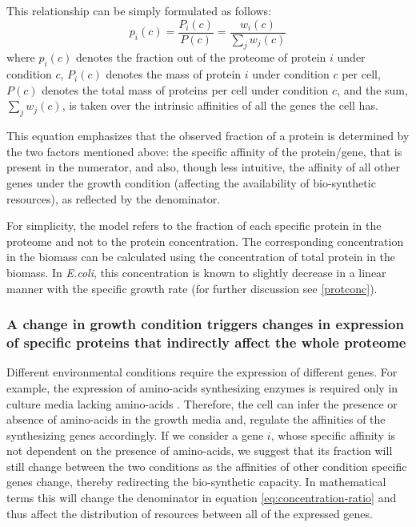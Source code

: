 \documentclass{article}
\begin{document}
This relationship can be simply formulated as follows:
\begin{equation}
  \label{eq:concentration-ratio}
  p_i(c)=\frac{P_i(c)}{P(c)}=\frac{w_i(c)}{\sum_jw_j(c)}
\end{equation}
where $p_i(c)$ denotes the fraction out of the proteome of protein $i$ under condition $c$, $P_i(c)$ denotes the mass of protein $i$ under condition $c$ per cell, $P(c)$ denotes the total mass of proteins per cell under condition $c$, and the sum, $\sum_jw_j(c)$, is taken over the intrinsic affinities of all the genes the cell has.

This equation emphasizes that the observed fraction of a protein is determined by the two factors mentioned above: the specific affinity of the protein/gene, that is present in the numerator, and also, though less intuitive, the affinity of all other genes under the growth condition (affecting the availability of bio-synthetic resources), as reflected by the denominator.

For simplicity, the model refers to the fraction of each specific protein in the proteome and not to the protein concentration.
The corresponding concentration in the biomass can be calculated using the concentration of total protein in the biomass.
In \emph{E.coli}, this concentration is known to slightly decrease in a linear manner with the specific growth rate \cite{Bremer1987,Valgepea2013,Scott2014} (for further discussion see \ref{protconc}).


\subsubsection{A change in growth condition triggers changes in expression of specific proteins that indirectly affect the whole proteome}
Different environmental conditions require the expression of different genes.
For example, the expression of amino-acids synthesizing enzymes is required only in culture media lacking amino-acids \cite{24656150,10515934}.
Therefore, the cell can infer the presence or absence of amino-acids in the growth media and, regulate the affinities of the synthesizing genes accordingly.
If we consider a gene $i$, whose specific affinity is not dependent on the presence of amino-acids, we suggest that its fraction will still change between the two conditions as the affinities of other condition specific genes change, thereby redirecting the bio-synthetic capacity.
In mathematical terms this will change the denominator in equation \ref{eq:concentration-ratio} and thus affect the distribution of resources between all of the expressed genes.
\end{document}
